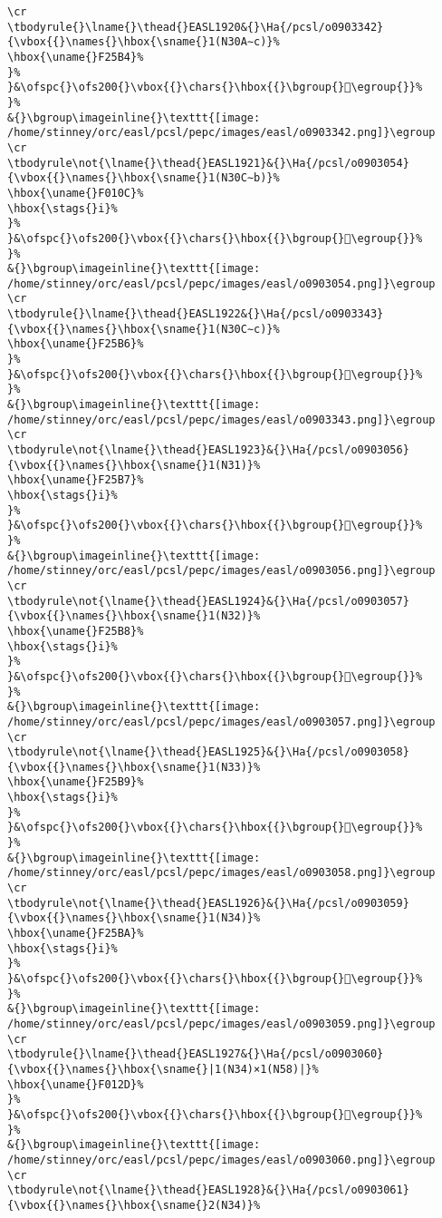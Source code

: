 \begin{verbatim}
\cr
\tbodyrule{}\lname{}\thead{}EASL1920&{}\Ha{/pcsl/o0903342}{\vbox{{}\names{}\hbox{\sname{}1(N30A∼c)}%
\hbox{\uname{}F25B4}%
}%
}&\ofspc{}\ofs200{}\vbox{{}\chars{}\hbox{{}\bgroup{}󲖴\egroup{}}%
}%
&{}\bgroup\imageinline{}\texttt{[image: /home/stinney/orc/easl/pcsl/pepc/images/easl/o0903342.png]}\egroup
\cr
\tbodyrule\not{\lname{}\thead{}EASL1921}&{}\Ha{/pcsl/o0903054}{\vbox{{}\names{}\hbox{\sname{}1(N30C∼b)}%
\hbox{\uname{}F010C}%
\hbox{\stags{}i}%
}%
}&\ofspc{}\ofs200{}\vbox{{}\chars{}\hbox{{}\bgroup{}󰄌\egroup{}}%
}%
&{}\bgroup\imageinline{}\texttt{[image: /home/stinney/orc/easl/pcsl/pepc/images/easl/o0903054.png]}\egroup
\cr
\tbodyrule{}\lname{}\thead{}EASL1922&{}\Ha{/pcsl/o0903343}{\vbox{{}\names{}\hbox{\sname{}1(N30C∼c)}%
\hbox{\uname{}F25B6}%
}%
}&\ofspc{}\ofs200{}\vbox{{}\chars{}\hbox{{}\bgroup{}󲖶\egroup{}}%
}%
&{}\bgroup\imageinline{}\texttt{[image: /home/stinney/orc/easl/pcsl/pepc/images/easl/o0903343.png]}\egroup
\cr
\tbodyrule\not{\lname{}\thead{}EASL1923}&{}\Ha{/pcsl/o0903056}{\vbox{{}\names{}\hbox{\sname{}1(N31)}%
\hbox{\uname{}F25B7}%
\hbox{\stags{}i}%
}%
}&\ofspc{}\ofs200{}\vbox{{}\chars{}\hbox{{}\bgroup{}󲖷\egroup{}}%
}%
&{}\bgroup\imageinline{}\texttt{[image: /home/stinney/orc/easl/pcsl/pepc/images/easl/o0903056.png]}\egroup
\cr
\tbodyrule\not{\lname{}\thead{}EASL1924}&{}\Ha{/pcsl/o0903057}{\vbox{{}\names{}\hbox{\sname{}1(N32)}%
\hbox{\uname{}F25B8}%
\hbox{\stags{}i}%
}%
}&\ofspc{}\ofs200{}\vbox{{}\chars{}\hbox{{}\bgroup{}󲖸\egroup{}}%
}%
&{}\bgroup\imageinline{}\texttt{[image: /home/stinney/orc/easl/pcsl/pepc/images/easl/o0903057.png]}\egroup
\cr
\tbodyrule\not{\lname{}\thead{}EASL1925}&{}\Ha{/pcsl/o0903058}{\vbox{{}\names{}\hbox{\sname{}1(N33)}%
\hbox{\uname{}F25B9}%
\hbox{\stags{}i}%
}%
}&\ofspc{}\ofs200{}\vbox{{}\chars{}\hbox{{}\bgroup{}󲖹\egroup{}}%
}%
&{}\bgroup\imageinline{}\texttt{[image: /home/stinney/orc/easl/pcsl/pepc/images/easl/o0903058.png]}\egroup
\cr
\tbodyrule\not{\lname{}\thead{}EASL1926}&{}\Ha{/pcsl/o0903059}{\vbox{{}\names{}\hbox{\sname{}1(N34)}%
\hbox{\uname{}F25BA}%
\hbox{\stags{}i}%
}%
}&\ofspc{}\ofs200{}\vbox{{}\chars{}\hbox{{}\bgroup{}󲖺\egroup{}}%
}%
&{}\bgroup\imageinline{}\texttt{[image: /home/stinney/orc/easl/pcsl/pepc/images/easl/o0903059.png]}\egroup
\cr
\tbodyrule{}\lname{}\thead{}EASL1927&{}\Ha{/pcsl/o0903060}{\vbox{{}\names{}\hbox{\sname{}|1(N34)×1(N58)|}%
\hbox{\uname{}F012D}%
}%
}&\ofspc{}\ofs200{}\vbox{{}\chars{}\hbox{{}\bgroup{}󰄭\egroup{}}%
}%
&{}\bgroup\imageinline{}\texttt{[image: /home/stinney/orc/easl/pcsl/pepc/images/easl/o0903060.png]}\egroup
\cr
\tbodyrule\not{\lname{}\thead{}EASL1928}&{}\Ha{/pcsl/o0903061}{\vbox{{}\names{}\hbox{\sname{}2(N34)}%

\end{verbatim}
